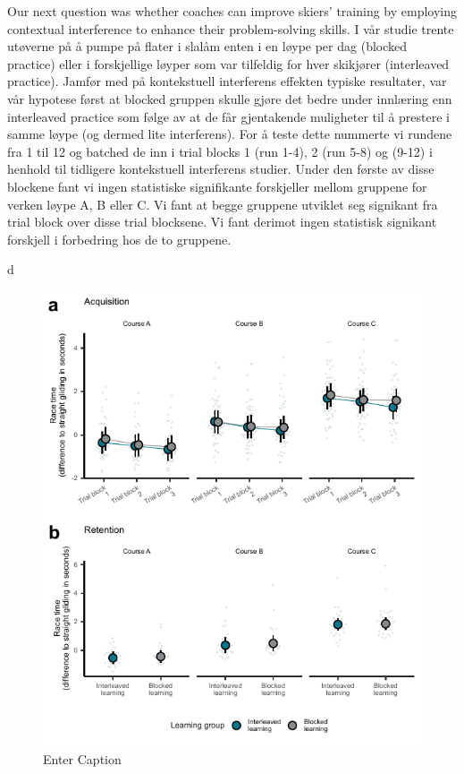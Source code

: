 Our next question was whether coaches can improve skiers' training by employing contextual interference to enhance their problem-solving skills. I vår studie trente utøverne på å pumpe på flater i slalåm enten i en løype per dag (blocked practice) eller i forskjellige løyper som var tilfeldig for hver skikjører (interleaved practice). Jamfør med på kontekstuell interferens effekten typiske resultater, var vår hypotese først at blocked gruppen skulle gjøre det bedre under innlæring enn interleaved practice som følge av at de får gjentakende muligheter til å prestere i samme løype (og dermed lite interferens). For å teste dette nummerte vi rundene fra 1 til 12 og batched de inn i trial blocks 1 (run 1-4), 2 (run 5-8) og (9-12) i henhold til tidligere kontekstuell interferens studier. Under den første av disse blockene fant vi ingen statistiske signifikante forskjeller mellom gruppene for verken løype A, B eller C. Vi fant at begge gruppene utviklet seg signikant fra trial block over disse trial blocksene. Vi fant derimot ingen statistisk signikant forskjell i forbedring hos de to gruppene. 

d\begin{figure}
    \centering
    \includegraphics[width=1\linewidth]{figure/figure_results_ci_acquisitionandretention.pdf}
    \caption{Enter Caption}
    \label{fig:enter-label}
\end{figure}
